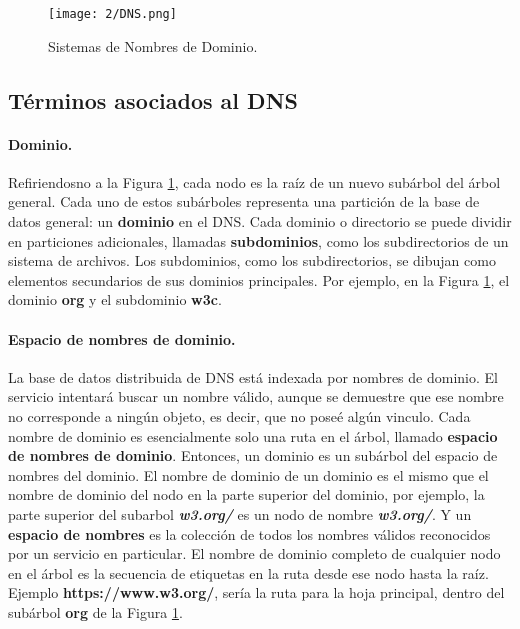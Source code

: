 			
		\begin{figure} 
			 \begin{center}									
			\texttt{[image: 2/DNS.png]}		
			\caption{Sistemas de Nombres de Dominio. }
			\label{fig:DNS} 		
		 \end{center}
	  \end{figure} 

\subsection{Términos asociados al DNS}

\paragraph{Dominio.}  Refiriendosno a la  Figura \ref{fig:DNS}, cada nodo es  la raíz de un nuevo subárbol del árbol general. Cada uno de estos subárboles representa una partición de la base de datos general: un \textbf{dominio} en el DNS. Cada dominio o directorio se puede dividir en particiones adicionales, llamadas \textbf{subdominios}, como los subdirectorios de un sistema de archivos. Los subdominios, como los subdirectorios, se dibujan como elementos secundarios de sus dominios principales. Por ejemplo, en la Figura \ref{fig:DNS}, el dominio \textbf{org} y el subdominio \textbf{w3c}.


\paragraph{Espacio de nombres de dominio.}  La base de datos distribuida de DNS está indexada por nombres de dominio. El servicio intentará buscar un nombre válido, aunque se demuestre que ese nombre no corresponde a ningún objeto, es decir, que no poseé algún vinculo.  Cada nombre de dominio es esencialmente solo una ruta en el árbol, llamado \textbf{espacio de nombres de dominio}. 
Entonces, un dominio es  un subárbol del espacio de nombres del dominio. El nombre de dominio de un dominio es el mismo que el nombre de dominio del nodo en la parte superior del dominio, por ejemplo, la parte superior del subarbol \textit{\textbf{w3.org/}} es un nodo de nombre \textit{\textbf{w3.org/}}. Y un \textbf{espacio de nombres} es la colección de todos los nombres válidos reconocidos por un servicio en particular. El nombre de dominio completo de cualquier nodo en el árbol es la secuencia de etiquetas en la ruta desde ese nodo hasta la raíz. Ejemplo {\textbf{https://www.w3.org/}}, sería la ruta para la hoja principal, dentro del subárbol \textbf{org} de la Figura \ref{fig:DNS}.

